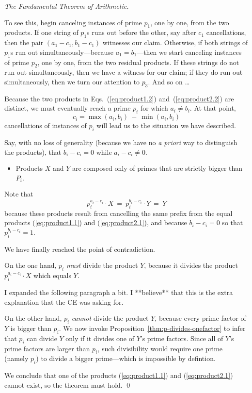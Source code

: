 \begin{proof}[The Fundamental Theorem of Arithmetic]
\begin{itemize}
To see this, begin canceling instances of prime $p_1$, one by one, from the two products.  If one string of $p_1$s runs out before the other, say after $c_1$ cancellations, then the pair $(a_1 -c_1, b_1 -c_1)$ witnesses our claim.  Otherwise, if both strings of $p_1$s run out simultaneously---because $a_1 = b_1$---then we start canceling instances of prime $p_2$, one by one, from the two residual products.  If these strings do not run out simultaneously, then we have a witness for our claim; if they do run out simultaneously, then we turn our attention to $p_3$.  And so on \ldots

\smallskip

Because the two products in Eqs.~(\ref{eq:product1.2}) and~(\ref{eq:product2.2}) are distinct, we must eventually reach a prime $p_i$ for which $a_i \neq b_i$.  At that point,
\[ c_i = \max(a_i, b_i) \ - \  \min(a_i, b_i) \]
cancellations of instances of $p_i$ will lead us to the situation we have described. 
\end{itemize}

Say, with no loss of generality (because we have no {\it a priori} way to distinguish the products), that $b_i -c_i = 0$ while $a_i -c_i \neq 0$.

\begin{itemize}
\item
Products $X$ and $Y$ are composed only of primes that are strictly bigger than $P_i$.
\end{itemize}
Note that 
\[ p_i^{a_i - c_i} \cdot X \ = \ p_i^{b_i -c_i} \cdot Y \ = \ Y \]
because these products result from cancelling the same prefix from the equal products (\ref{eq:product1.1}) and (\ref{eq:product2.1}), and because $b_i -c_i =0$ so that $p_i^{b_i -c_i}  = 1$.

\medskip

\noindent
We have finally reached the point of contradiction.

\smallskip

On the one hand, $p_i$ {\em must} divide the product $Y$, because it divides the product $p_i^{a_i -c_i} \cdot X$ which equals $Y$.

{\Arny I expanded the following paragraph a bit.  I **believe** that this is the extra explanation that the CE was asking for.}

On the other hand, $p_i$ {\em cannot} divide the product $Y$, because every prime factor of $Y$ is bigger than $p_i$.   We now invoke Proposition~\ref{thm:p-divides-onefactor} to infer that $p_i$ can divide $Y$ only if it divides one of $Y$'s prime factors.  Since all of $Y$'s prime factors are larger than $p_i$, such divisibility would require one prime (namely $p_i$) to divide a bigger prime---which is impossible by defintion.

\smallskip

We conclude that one of the products (\ref{eq:product1.1}) and (\ref{eq:product2.1}) cannot exist, so the theorem must hold.  \qed
\end{proof}


